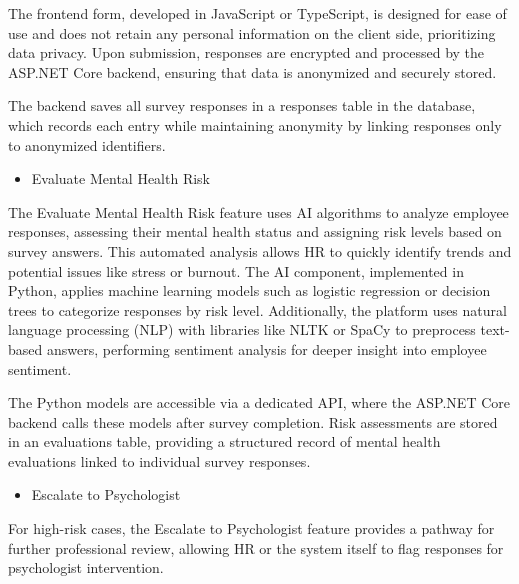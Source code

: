 \documentclass[conference]{IEEEtran}
\begin{document}
            The frontend form, developed in JavaScript or TypeScript, is designed for ease of use and does not retain any personal information on the client side, prioritizing data privacy. Upon submission, responses are encrypted and processed by the ASP.NET Core backend, ensuring that data is anonymized and securely stored.
            \newline
        
            The backend saves all survey responses in a responses table in 
            the database, which records each entry while maintaining 
            anonymity by linking responses only to anonymized identifiers.
            \newline    
        
            \begin{itemize}
                \item Evaluate Mental Health Risk
            \end{itemize}
            
            The Evaluate Mental Health Risk feature uses AI algorithms to 
            analyze employee responses, assessing their mental health status and assigning risk levels based on survey answers. This automated analysis allows HR to quickly identify trends and potential issues like stress or burnout. The AI component, implemented in Python, applies machine learning models such as logistic regression or decision trees to categorize responses by risk level. Additionally, the platform uses natural language processing (NLP) with libraries like NLTK or SpaCy to preprocess text-based answers, performing sentiment analysis for deeper insight into employee sentiment. \newline
             
            The Python models are accessible via a dedicated API, where the ASP.NET Core backend calls these models after survey completion. Risk assessments are stored in an evaluations table, providing a structured record of mental health evaluations linked to individual survey responses.
            \newline    

            \begin{itemize}
                \item Escalate to Psychologist
            \end{itemize}
    
            For high-risk cases, the Escalate to Psychologist feature 
            provides a pathway for further professional review, allowing 
            HR or the system itself to flag responses for psychologist 
            intervention.
            \newline
    
\end{document}
